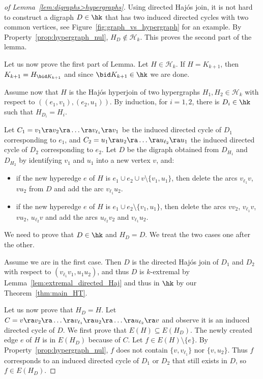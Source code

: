 \begin{proof}[of Lemma~\ref{lem:digraphs>hypergraphs}]
    Using directed Haj\'os join, it is not hard to construct a digraph $D \in \hk$ that has two induced directed cycles with two common vertices, see Figure~\ref{fig:graph_vs_hypergraph} for an example. By Property~\ref{prop:hypergraph_nul}, $H_D \notin \mathcal H_k$. This proves the second part of the lemma.  

    Let us now prove  the first part of Lemma. Let $H \in \mathcal H_k$. 
    If $H= K_{k+1}$, then  $K_{k+1} = H_{\bid K_{k+1}}$ and since $ \bid K_{k+1} \in \hk$ we are done. 
    
    Assume now that $H$ is the Haj\'os hyperjoin of two hypergraphs $H_1, H_2 \in \mathcal H_k$ with respect to $((e_1, v_1), (e_2, u_1))$. 
    By induction, for $i=1,2$, there is $D_i \in \hk$ such that $H_{D_i} = H_i$. 

    Let $C_1 = v_1 \ra v_2 \ra \dots  \ra  v_{\ell_1} \ra v_1$ be the induced directed cycle of $D_1$ corresponding to $e_1$, and $C_2 = u_1 \ra u_2 \ra \dots  \ra  u_{\ell_2} \ra u_1$ the induced directed cycle of $D_2$ corresponding to $e_2$. 
    Let $D$ be the digraph obtained from $D_{H_1}$ and $D_{H_2}$ by identifying $v_1$ and $u_1$ into a new vertex $v$, and:

 
\begin{itemize}
    \item if the new hyperedge $e$ of $H$ is $e_1\cup e_2 \cup v \setminus \{v_1,u_1\}$, then delete the arcs $v_{\ell_1}v$, $vu_2$ from $D$ and add the arc $v_{\ell_1}u_{2}$.   
    \item if the new hyperedge $e$ of $H$ is $e_1\cup e_2 \setminus \{v_1,u_1\}$, then delete the arcs $vv_2$, $v_{\ell_1}v$, $vu_2$, $u_{\ell_2}v$ and add the arcs $u_{\ell_2}v_{2}$ and $v_{\ell_1}u_{2}$. 
\end{itemize}

We need to prove that $D \in \hk$ and $H_D=D$. 
We treat the two cases one after the other. 
\smallskip 

Assume we are in the first case. 
Then $D$ is the directed Haj\'os join of $D_1$ and $D_2$ with respect to $(v_{\ell_1}v_1, u_1u_2)$, and thus $D$ is $k$-extremal by Lemma~\ref{lem:extremal_directed_Haj} and thus in $\hk$ by our Theorem~\ref{thm:main_HT}.
 

Let us now prove that $H_D = H$.  
Let $C = v \ra v_2 \ra \dots \ra v_{\ell_1} \ra u_2 \ra \dots \ra u_{\ell_2} \ra v$ and observe it is an induced directed cycle of $D$. 
We first prove that $E(H) \subseteq E(H_D)$. The newly created edge $e$ of $H$ is in $E(H_D)$ because of $C$. 
Let $f \in E(H) \setminus \{e\}$. 
By Property~\ref{prop:hypergraph_nul},  $f$ does not contain $\{v,v_{\ell_1}\}$ nor $\{v,u_2\}$. Thus $f$ corresponds to an induced directed cycle of $D_1$ or $D_2$ that still exists in $D$, so $f \in E(H_D)$.   


\end{proof}
